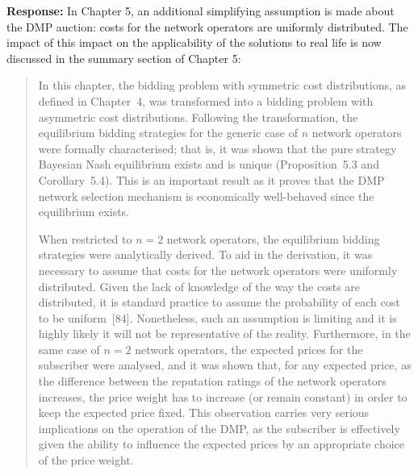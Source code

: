 \documentclass[10pt,a4paper,notitlepage]{article}
\numberwithin{equation}{section}
\begin{document}
\textbf{Response:}
In Chapter 5, an additional simplifying assumption is made about the DMP auction: costs for the network operators are uniformly distributed. The impact of this impact on the applicability of the solutions to real life is now discussed in the summary section of Chapter 5:
\begin{quote}
In this chapter, the bidding problem with symmetric cost distributions, as defined in Chapter~4, was transformed into a bidding problem with asymmetric cost distributions. Following the transformation, the equilibrium bidding strategies for the generic case of $n$ network operators were formally characterised; that is, it was shown that the pure strategy Bayesian Nash equilibrium exists and is unique (Proposition~5.3 and Corollary~5.4). This is an important result as it proves that the DMP network selection mechanism is economically well-behaved since the equilibrium exists.

When restricted to $n=2$ network operators, the equilibrium bidding strategies were analytically derived. To aid in the derivation, it was necessary to assume that costs for the network operators were uniformly distributed. Given the lack of knowledge of the way the costs are distributed, it is standard practice to assume the probability of each cost to be uniform~[84]. Nonetheless, such an assumption is limiting and it is highly likely it will not be representative of the reality. Furthermore, in the same case of $n=2$ network operators, the expected prices for the subscriber were analysed, and it was shown that, for any expected price, as the difference between the reputation ratings of the network operators increases, the price weight has to increase (or remain constant) in order to keep the expected price fixed. This observation carries very serious implications on the operation of the DMP, as the subscriber is effectively given the ability to influence the expected prices by an appropriate choice of the price weight.


\end{quote}
\end{document}

